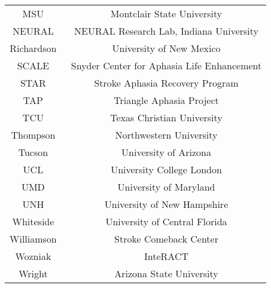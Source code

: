 \begin{table}[h]
{\begin{tabular}{c|c}
MSU~\cite{MSU2013apha}                          & Montclair State University                 \\
NEURAL~\cite{neural2023apha}                    & NEURAL Research Lab, Indiana University    \\
Richardson~\cite{Richardson2008apha}            & University of New Mexico                   \\
SCALE~\cite{scale2013apha}                      & Snyder Center for Aphasia Life Enhancement \\
STAR~\cite{star2013apha}                        & Stroke Aphasia Recovery Program            \\
TAP~\cite{tap2013apha}                          & Triangle Aphasia Project                   \\
TCU~\cite{tcu2013apha}                          & Texas Christian University                 \\
Thompson~\cite{thompson2013apha}                & Northwestern University                    \\
Tucson~\cite{tucson2013apha}                    & University of Arizona                      \\
UCL~\cite{ucl2021apha}                          & University College London                  \\
UMD~\cite{faroqi2018comparison}                 & University of Maryland                     \\
UNH~\cite{unh2013apha}                          & University of New Hampshire                \\
Whiteside~\cite{whiteside2013apha}              & University of Central Florida              \\
Williamson~\cite{williamson2013apha}            & Stroke Comeback Center                     \\
Wozniak~\cite{wozniak2013apha}                  & InteRACT                                   \\
Wright~\cite{wright2013apha}                    & Arizona State University                   \\ \hline
\end{tabular}%
}
\end{table}